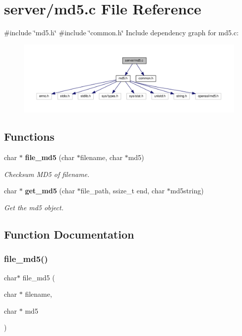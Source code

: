 \section{server/md5.c File Reference}
\label{md5_8c}
{\ttfamily \#include \char`\"{}md5.\+h\char`\"{}}\newline
{\ttfamily \#include \char`\"{}common.\+h\char`\"{}}\newline
Include dependency graph for md5.\+c\+:\nopagebreak
\begin{figure}[H]
\begin{center}
\leavevmode
\includegraphics[width=350pt]{md5_8c__incl}
\end{center}
\end{figure}
\subsection*{Functions}
\begin{DoxyCompactItemize}
\item 
char $\ast$ \textbf{ file\+\_\+md5} (char $\ast$filename, char $\ast$md5)
\begin{DoxyCompactList}\small\item\em Checksum M\+D5 of filename. \end{DoxyCompactList}\item 
char $\ast$ \textbf{ get\+\_\+md5} (char $\ast$file\+\_\+path, ssize\+\_\+t end, char $\ast$md5string)
\begin{DoxyCompactList}\small\item\em Get the md5 object. \end{DoxyCompactList}\end{DoxyCompactItemize}


\subsection{Function Documentation}
\mbox{\label{md5_8c_adaa982699055a63eb33d040e7d13f965}} 
\subsubsection{file\+\_\+md5()}
{\footnotesize\ttfamily char$\ast$ file\+\_\+md5 (\begin{DoxyParamCaption}\item[{char $\ast$}]{filename,  }\item[{char $\ast$}]{md5 }\end{DoxyParamCaption})}



